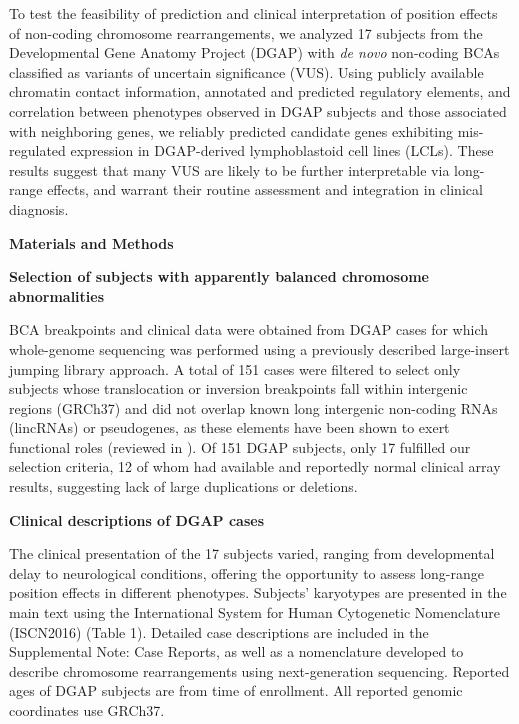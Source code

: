 \documentclass[a4paper,twoside=true,openright,parskip=full,chapterprefix=true,11pt,headings=normal,bibliography=totoc,listof=totoc,titlepage=on,captions=tableabove,draft=false]{scrreprt}
\theoremstyle{definition}
\theoremstyle{definition}
\theoremstyle{definition}
\theoremstyle{remark}
\begin{document}
To test the feasibility of prediction and clinical interpretation of
position effects of non-coding chromosome rearrangements, we analyzed 17
subjects from the Developmental Gene Anatomy Project
(DGAP)\citep{Higgins2008, Ligon2005, Kim2008, Lu2007} with \emph{de
novo} non-coding BCAs classified as variants of uncertain significance
(VUS). Using publicly available chromatin contact information, annotated
and predicted regulatory elements, and correlation between phenotypes
observed in DGAP subjects and those associated with neighboring genes,
we reliably predicted candidate genes exhibiting mis-regulated
expression in DGAP-derived lymphoblastoid cell lines (LCLs). These
results suggest that many VUS are likely to be further interpretable via
long-range effects, and warrant their routine assessment and integration
in clinical diagnosis.

\textbf{Materials and Methods}

\textbf{Selection of subjects with apparently balanced chromosome
abnormalities}

BCA breakpoints and clinical data were obtained from DGAP cases for
which whole-genome sequencing was performed using a previously described
large-insert jumping library
approach.\citep{Higgins2008, Ligon2005, Kim2008, Lu2007, Redin2017} A
total of 151 cases were filtered to select only subjects whose
translocation or inversion breakpoints fall within intergenic regions
(GRCh37) and did not overlap known long intergenic non-coding RNAs
(lincRNAs) or pseudogenes, as these elements have been shown to exert
functional roles (reviewed in \citep{Quinn2016}
\citep{Pink2011, Muro2010}). Of 151 DGAP subjects, only 17 fulfilled our
selection criteria, 12 of whom had available and reportedly normal
clinical array results, suggesting lack of large duplications or
deletions.

\textbf{Clinical descriptions of DGAP cases}

The clinical presentation of the 17 subjects varied, ranging from
developmental delay to neurological conditions, offering the opportunity
to assess long-range position effects in different phenotypes. Subjects'
karyotypes are presented in the main text using the International System
for Human Cytogenetic Nomenclature (ISCN2016) (Table 1). Detailed case
descriptions are included in the Supplemental Note: Case Reports, as
well as a nomenclature developed to describe chromosome rearrangements
using next-generation sequencing.\citep{Ordulu2014} Reported ages of
DGAP subjects are from time of enrollment. All reported genomic
coordinates use GRCh37.
\end{document}
